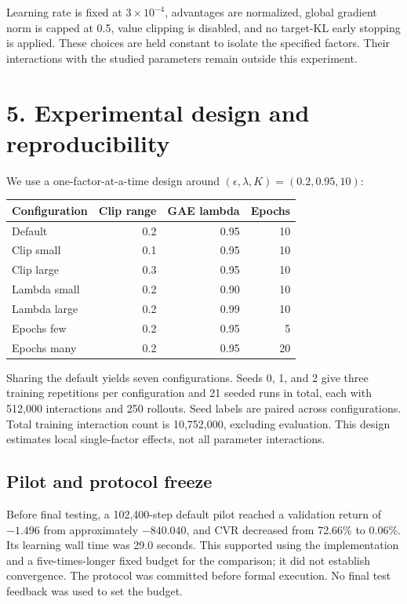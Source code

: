 \documentclass[10pt,a4paper]{article}
\begin{document}
Learning rate is fixed at $3\times10^{-4}$, advantages are normalized, global gradient norm is capped at 0.5, value clipping is disabled, and no target-KL early stopping is applied. These choices are held constant to isolate the specified factors. Their interactions with the studied parameters remain outside this experiment.
\clearpage

\section*{5. Experimental design and reproducibility}
We use a one-factor-at-a-time design around $(\epsilon,\lambda,K)=(0.2,0.95,10)$:
\begin{center}
\begin{tabular}{lrrr}
\toprule Configuration & Clip range & GAE lambda & Epochs \\
\midrule Default & 0.2 & 0.95 & 10 \\
Clip small & 0.1 & 0.95 & 10 \\
Clip large & 0.3 & 0.95 & 10 \\
Lambda small & 0.2 & 0.90 & 10 \\
Lambda large & 0.2 & 0.99 & 10 \\
Epochs few & 0.2 & 0.95 & 5 \\
Epochs many & 0.2 & 0.95 & 20 \\
\bottomrule
\end{tabular}
\end{center}
Sharing the default yields seven configurations. Seeds 0, 1, and 2 give three training repetitions per configuration and 21 seeded runs in total, each with 512,000 interactions and 250 rollouts. Seed labels are paired across configurations. Total training interaction count is 10,752,000, excluding evaluation. This design estimates local single-factor effects, not all parameter interactions.

\subsection*{Pilot and protocol freeze}
Before final testing, a 102,400-step default pilot reached a validation return of $-1.496$ from approximately $-840.040$, and CVR decreased from 72.66\% to 0.06\%. Its learning wall time was 29.0 seconds. This supported using the implementation and a five-times-longer fixed budget for the comparison; it did not establish convergence. The protocol was committed before formal execution. No final test feedback was used to set the budget.
\end{document}
